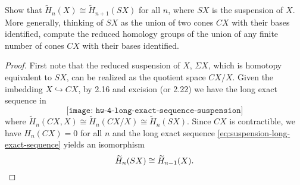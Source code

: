 \begin{problem}[Hatcher {\S}2.1, Ex.\@ 20]
Show that $\widetilde H_n(X)\cong\widetilde H_{n+1}(SX)$ for all $n$, where
$SX$ is the suspension of $X$. More generally, thinking of $SX$ as the
union of two cones $CX$ with their bases identified, compute the reduced
homology groups of the union of any finite number of cones $CX$ with their
bases identified.
\end{problem}
\begin{proof}
First note that the reduced suspension of $X$, $\Sigma X$, which is
homotopy equivalent to $SX$, can be realized as the quotient space
$CX/X$. Given the imbedding $X\hookrightarrow CX$, by 2.16 and excision (or
2.22) we have the long exact sequence in
\begin{equation}
\label{eq:suspension-long-exact-sequence}
\texttt{[image: hw-4-long-exact-sequence-suspension]}
\end{equation}
where $\widetilde H_n(CX,X)\cong\widetilde H_n(CX/X)\cong\widetilde
H_n(SX)$. Since $CX$ is contractible, we have $H_n(CX)=0$ for all
$n$ and the long exact sequence \eqref{eq:suspension-long-exact-sequence}
yields an isomorphism
\[
\widetilde H_n(SX)\cong\widetilde H_{n-1}(X).\qedhere
\]
\end{proof}
\newpage

